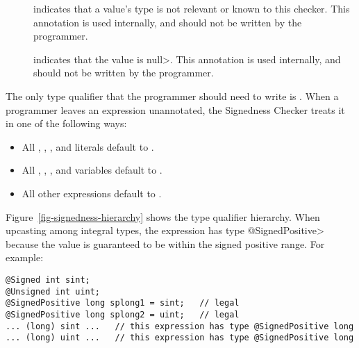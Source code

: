 \begin{description}
\item[]
    indicates that a value's type is not relevant or known to this checker.
    This annotation is used internally, and should not be
    written by the programmer.

\item[]
  indicates that the value is \<null>.
    This annotation is used internally, and should not
    be written by the programmer.

\end{description}



The only type qualifier that the programmer should need to write is
.
When a programmer leaves an expression unannotated, the
Signedness Checker treats it in one of the following ways:

\begin{itemize}

    \item
    All , , , and  literals default
    to .
    \item
    All , , , and  variables default
    to .
    \item
    All other expressions default to .

\end{itemize}



Figure~\ref{fig-signedness-hierarchy} shows the type qualifier hierarchy.
When upcasting among integral types, the expression has type
\<@SignedPositive> because the value is guaranteed to be within the signed
positive range.  For example:

\begin{Verbatim}
@Signed int sint;
@Unsigned int uint;
@SignedPositive long splong1 = sint;   // legal
@SignedPositive long splong2 = uint;   // legal
... (long) sint ...   // this expression has type @SignedPositive long
... (long) uint ...   // this expression has type @SignedPositive long
\end{Verbatim}


